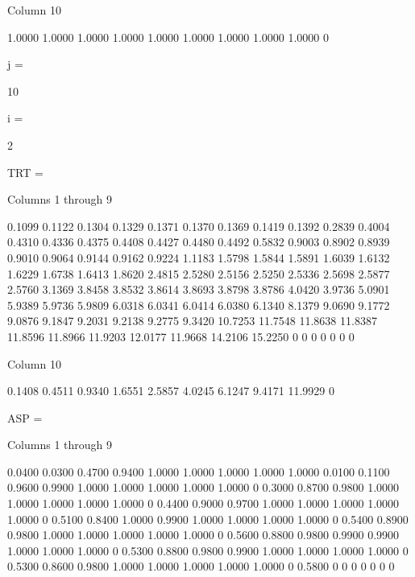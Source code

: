   Column 10

    1.0000
    1.0000
    1.0000
    1.0000
    1.0000
    1.0000
    1.0000
    1.0000
    1.0000
         0


j =

    10


i =

     2


TRT =

  Columns 1 through 9

    0.1099    0.1122    0.1304    0.1329    0.1371    0.1370    0.1369    0.1419    0.1392
    0.2839    0.4004    0.4310    0.4336    0.4375    0.4408    0.4427    0.4480    0.4492
    0.5832    0.9003    0.8902    0.8939    0.9010    0.9064    0.9144    0.9162    0.9224
    1.1183    1.5798    1.5844    1.5891    1.6039    1.6132    1.6229    1.6738    1.6413
    1.8620    2.4815    2.5280    2.5156    2.5250    2.5336    2.5698    2.5877    2.5760
    3.1369    3.8458    3.8532    3.8614    3.8693    3.8798    3.8786    4.0420    3.9736
    5.0901    5.9389    5.9736    5.9809    6.0318    6.0341    6.0414    6.0380    6.1340
    8.1379    9.0690    9.1772    9.0876    9.1847    9.2031    9.2138    9.2775    9.3420
   10.7253   11.7548   11.8638   11.8387   11.8596   11.8966   11.9203   12.0177   11.9668
   14.2106   15.2250         0         0         0         0         0         0         0

  Column 10

    0.1408
    0.4511
    0.9340
    1.6551
    2.5857
    4.0245
    6.1247
    9.4171
   11.9929
         0


ASP =

  Columns 1 through 9

    0.0400    0.0300    0.4700    0.9400    1.0000    1.0000    1.0000    1.0000    1.0000
    0.0100    0.1100    0.9600    0.9900    1.0000    1.0000    1.0000    1.0000    1.0000
         0    0.3000    0.8700    0.9800    1.0000    1.0000    1.0000    1.0000    1.0000
         0    0.4400    0.9000    0.9700    1.0000    1.0000    1.0000    1.0000    1.0000
         0    0.5100    0.8400    1.0000    0.9900    1.0000    1.0000    1.0000    1.0000
         0    0.5400    0.8900    0.9800    1.0000    1.0000    1.0000    1.0000    1.0000
         0    0.5600    0.8800    0.9800    0.9900    0.9900    1.0000    1.0000    1.0000
         0    0.5300    0.8800    0.9800    0.9900    1.0000    1.0000    1.0000    1.0000
         0    0.5300    0.8600    0.9800    1.0000    1.0000    1.0000    1.0000    1.0000
         0    0.5800         0         0         0         0         0         0         0

